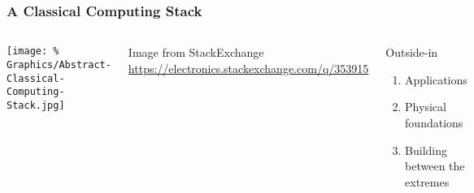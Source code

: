 \begin{frame}
  \frametitle{A Classical Computing Stack}

  \begin{columns}
    \texttt{[image: \%
      Graphics/Abstract-Classical-Computing-Stack.jpg]}
    
    Image from StackExchange \url{https://electronics.stackexchange.com/q/353915}

  
    \begin{block}{Outside-in}
      \begin{enumerate}
      \item Applications
      \item Physical foundations
      \item Building between the extremes
      \end{enumerate}
    \end{block}
  \end{columns}
\end{frame}
